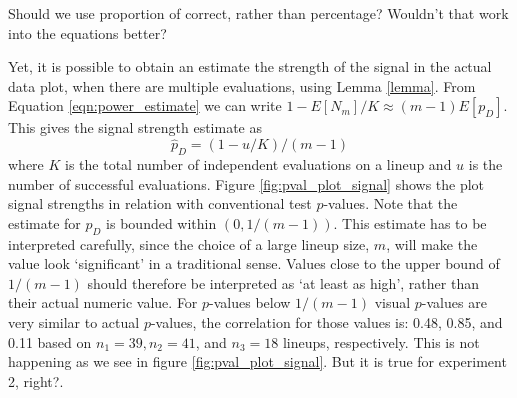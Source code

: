 \documentclass{article}
\newcommand{\blue}[1]{{\color{blue} #1}} %
\newcommand{\green}[1]{{\color{green} #1}} %
\newcommand{\hh}[1]{{\color{orange} #1}} %
\begin{document}
\green{Should we use proportion of correct, rather than percentage? Wouldn't that work into the equations better?}

Yet, it is possible to obtain an estimate the strength of the signal in the actual data plot, when there are multiple evaluations, using Lemma \ref{lemma}. From Equation \ref{eqn:power_estimate}  we can write $1 - E[N_m]/K \approx (m-1)E[p_D] $. This gives the signal strength estimate as  
\[
\hat p_D= (1- {u}/{K})/({m-1})
\]
where $K$ is the total number of independent evaluations on a lineup and $u$ is the number of successful evaluations. 
Figure \ref{fig:pval_plot_signal} shows the plot signal strengths in relation with conventional test $p$-values. 
\hh{Note that the estimate for $p_D$ is bounded within $(0, 1/(m-1))$. This estimate has to be interpreted carefully, since the  choice of a large lineup size, $m$, will make the value look `significant' in a traditional sense. Values close to the upper bound of $1/(m-1)$ should therefore be interpreted as `at least as high', rather than their actual numeric value.}
\hh{For $p$-values below $1/(m-1)$ visual $p$-values are very similar to actual $p$-values, the correlation for those values is: 0.48, 0.85, and 0.11 based on $n_1 = 39, n_2 = 41$, and $n_3= 18$ lineups, respectively.  }  \blue{This is not happening as we see in figure \ref{fig:pval_plot_signal}. But it is true for experiment 2, right?. }



\end{document}
